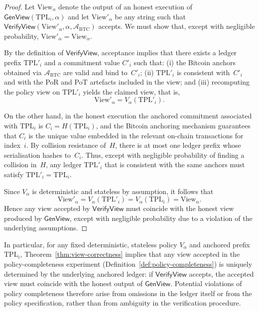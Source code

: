 \documentclass[11pt]{article}
\begin{document}
\begin{proof}
Let $\mathrm{View}_\alpha$ denote the output of an honest execution of
$\mathsf{GenView}(\mathrm{TPL}_i,\alpha)$ and let
$\mathrm{View}'_\alpha$ be any string such that
$\mathsf{VerifyView}(\mathrm{View}'_\alpha,\alpha,\mathcal{A}_{\mathrm{BTC}})$
accepts.
We must show that, except with negligible probability,
$\mathrm{View}'_\alpha = \mathrm{View}_\alpha$.

By the definition of
$\mathsf{VerifyView}$, acceptance implies that there exists a ledger prefix
$\mathrm{TPL}'_i$ and a commitment value $C'_i$ such that:
(i) the Bitcoin anchors obtained via $\mathcal{A}_{\mathrm{BTC}}$ are valid
and bind to~$C'_i$;
(ii) $\mathrm{TPL}'_i$ is consistent with~$C'_i$ and with the PoR and PoT
artefacts included in the view; and
(iii) recomputing the policy view on $\mathrm{TPL}'_i$ yields the claimed
view, that is,
\[
  \mathrm{View}'_\alpha
  =
  V_\alpha(\mathrm{TPL}'_i).
\]

On the other hand, in the honest execution the anchored commitment associated
with $\mathrm{TPL}_i$ is $C_i = H(\mathrm{TPL}_i)$, and the Bitcoin
anchoring mechanism guarantees that $C_i$ is the unique value embedded in the
relevant on-chain transactions for index~$i$.
By collision resistance of~$H$, there is at most one ledger prefix whose
serialisation hashes to~$C_i$.
Thus, except with negligible probability of finding a collision in~$H$, any
ledger $\mathrm{TPL}'_i$ that is consistent with the same anchors must satisfy
$\mathrm{TPL}'_i = \mathrm{TPL}_i$.

Since $V_\alpha$ is deterministic and stateless by assumption,
it follows that
\[
  \mathrm{View}'_\alpha
  = V_\alpha(\mathrm{TPL}'_i)
  = V_\alpha(\mathrm{TPL}_i)
  = \mathrm{View}_\alpha.
\]
Hence any view accepted by $\mathsf{VerifyView}$ must coincide with the honest
view produced by $\mathsf{GenView}$, except with negligible probability due to
a violation of the underlying assumptions.
\end{proof}
In particular, for any fixed deterministic, stateless policy $V_\alpha$ and anchored prefix $\mathrm{TPL}_i$,
Theorem~\ref{thm:view-correctness} implies that any view accepted in the policy-completeness experiment
(Definition~\ref{def:policy-completeness}) is uniquely determined by the underlying anchored ledger:
if $\mathsf{VerifyView}$ accepts, the accepted view must coincide with the honest output of $\mathsf{GenView}$.
Potential violations of policy completeness therefore arise from omissions in the ledger itself or from the
policy specification, rather than from ambiguity in the verification procedure.
\end{document}
